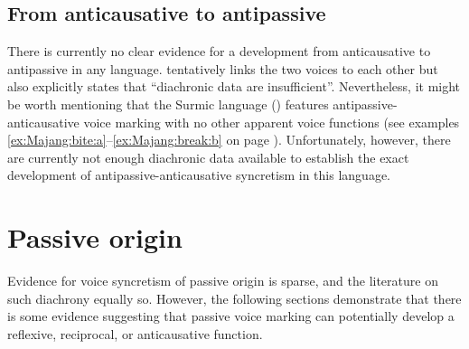 \subsection{From anticausative to antipassive} \label{diachrony:antc2antp}
There is currently no clear evidence for a development from anticausative to antipassive in any language. \cite[225]{haspelmath:2003} tentatively links the two voices to each other but also explicitly states that “diachronic data are insufficient”. Nevertheless, it might be worth mentioning that the Surmic language  () features antipassive-anticausative voice marking with no other apparent voice functions (see examples \ref{ex:Majang:bite:a}--\ref{ex:Majang:break:b} on page \pageref{ex:Majang:bite:a}). Unfortunately, however, there are currently not enough diachronic data available to establish the exact development of antipassive-anticausative syncretism in this language. 

\section{Passive origin} \label{diachrony:passive}
Evidence for voice syncretism of passive origin is sparse, and the literature on such diachrony equally so. However, the following sections demonstrate that there is some evidence suggesting that passive voice marking can potentially develop a reflexive, reciprocal, or anticausative function.

